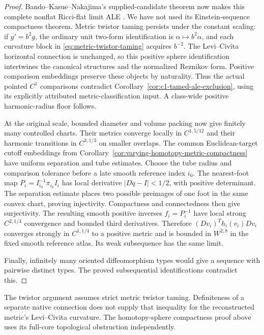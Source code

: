 \documentclass[11pt]{article}
\numberwithin{equation}{section}
\theoremstyle{definition}
\theoremstyle{remark}
\begin{document}
\begin{proof}
Bando--Kasue--Nakajima's supplied-candidate theorem now
makes this complete nonflat Ricci-flat limit ALE
\cite[Theorem~(1.5) and Remark~(1.8)(1),
pp.~314--315]{BandoKasueNakajima1989Coordinates}.
We have not used its Einstein-sequence compactness theorem.
Metric twistor taming persists under the constant scaling:
if $g'=b^2g$, the ordinary unit two-form identification is
$\alpha\mapsto b^2\alpha$, and each curvature block in
\eqref{eq:metric-twistor-taming} acquires $b^{-2}$.
The Levi--Civita horizontal connection is unchanged, so
this positive sphere identification intertwines the
canonical structures and the normalized Reznikov form.
Positive comparison embeddings preserve these objects by
naturality. Thus the actual pointed $C^1$ comparisons
contradict Corollary~\ref{cor:c1-tamed-ale-exclusion},
using its explicitly attributed metric-classification input.
A class-wide positive harmonic-radius floor follows.

At the original scale, bounded diameter and volume packing
now give finitely many controlled charts. Their metrics
converge locally in $C^{1,5/12}$ and their harmonic
transitions in $C^{3,1/3}$ on smaller overlaps. The common
Euclidean-target cutoff embeddings from
Corollary~\ref{cor:varying-homotopy-metric-compactness} have
uniform separation and tube estimates. Choose the tube
radius and comparison tolerance before a late smooth
reference index $i_0$. The nearest-foot map
$P_i=I_{i_0}^{-1}\pi_{i_0}I_i$ has local derivative
$|Dq-I|<1/2$, with positive determinant.
The separation estimate places two possible preimages of
one foot in the same convex chart, proving injectivity.
Compactness and connectedness then give surjectivity.
The resulting smooth positive inverses $f_i=P_i^{-1}$
have local strong $C^{2,1/4}$ convergence and bounded third
derivatives. Therefore $(Dv_i)^Th_i(v_i)Dv_i$ converges
strongly in $C^{1,1/4}$ to a positive metric and is bounded
in $W^{2,8}$ in the fixed smooth reference atlas. Its weak
subsequence has the same limit.

Finally, infinitely many oriented diffeomorphism types
would give a sequence with pairwise distinct types.
The proved subsequential identifications contradict this.
\end{proof}

The twistor argument assumes strict metric twistor taming.
Definiteness of a separate native connection does not supply
that inequality for the reconstructed metric's Levi--Civita
curvature. The homotopy-sphere compactness proof above uses
its full-core topological obstruction independently.
\end{document}
